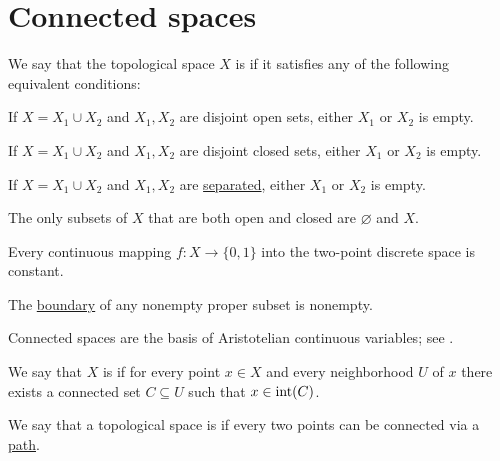 \section{Connected spaces}\label{sec:connected_spaces}

\begin{definition}\label{def:connected_space}
  We say that the topological space \( X \) is  if it satisfies any of the following equivalent conditions:
  \begin{thmenum}
     If \( X = X_1 \cup X_2 \) and \( X_1, X_2 \) are disjoint open sets, either \( X_1 \) or \( X_2 \) is empty.

     If \( X = X_1 \cup X_2 \) and \( X_1, X_2 \) are disjoint closed sets, either \( X_1 \) or \( X_2 \) is empty.

     If \( X = X_1 \cup X_2 \) and \( X_1, X_2 \) are \hyperref[def:topological_space_separation]{separated}, either \( X_1 \) or \( X_2 \) is empty.

     The only subsets of \( X \) that are both open and closed are \( \varnothing \) and \( X \).

     Every continuous mapping \( f: X \to \{ 0, 1 \} \) into the two-point discrete space is constant.

     The \hyperref[def:topological_boundary_operator]{boundary} of any nonempty proper subset is nonempty.
  \end{thmenum}
\end{definition}
\begin{comments}
  \item Connected spaces are the basis of Aristotelian continuous variables; see .
\end{comments}

\begin{definition}\label{def:locally_connected_space}
  We say that \( X \) is  if for every point \( x \in X \) and every neighborhood \( U \) of \( x \) there exists a connected set \( C \subseteq U \) such that \( x \in \operatorname{int}(C) \).
\end{definition}

\begin{definition}\label{def:path_connected_space}
  We say that a topological space is  if every two points can be connected via a \hyperref[def:parametric_curve]{path}.
\end{definition}

